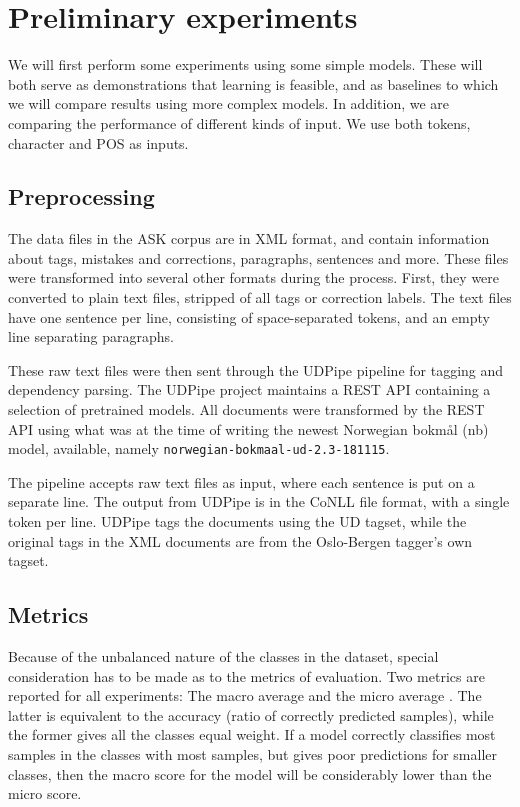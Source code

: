 \chapter{Preliminary experiments}

We will first perform some experiments using some simple models. These will
both serve as demonstrations that learning is feasible, and as baselines
to which we will compare results using more complex models. In addition,
we are comparing the performance of different kinds of input. We use both
tokens, character \ngrams and \ac{POS} \ngrams as inputs.


\section{Preprocessing}

The data files in the ASK corpus are in \ac{XML} format, and contain information
about tags, mistakes and corrections, paragraphs, sentences and more. These
files were transformed into several other formats during the process. First,
they were converted to plain text files, stripped of all tags or correction
labels. The text files have one sentence per line, consisting of
space-separated tokens, and an empty line separating paragraphs.

These raw text files were then sent through the UDPipe pipeline
\autocite{udpipe:2017} for tagging and dependency parsing. The UDPipe project
maintains a \ac{REST} \ac{API} containing a selection of pretrained models. All
documents were transformed by the \ac{REST} \ac{API} using what was at the time of
writing the newest Norwegian bokmål (nb) model, available, namely
\texttt{norwegian-bokmaal-ud-2.3-181115}.

The pipeline accepts raw text files as input, where each sentence is put on a
separate line. The output from UDPipe is in the CoNLL file format, with a
single token per line. UDPipe tags the documents using the UD tagset, while
the original tags in the \ac{XML} documents are from the Oslo-Bergen tagger's own
tagset.


\section{Metrics}

Because of the unbalanced nature of the classes in the dataset, special
consideration has to be made as to the metrics of evaluation. Two metrics are
reported for all experiments: The macro average \FI and the micro average \FI.
The latter is equivalent to the accuracy (ratio of correctly predicted
samples), while the former gives all the classes equal weight. If a model
correctly classifies most samples in the classes with most samples, but gives
poor predictions for smaller classes, then the macro \FI score for the model
will be considerably lower than the micro \FI score.

